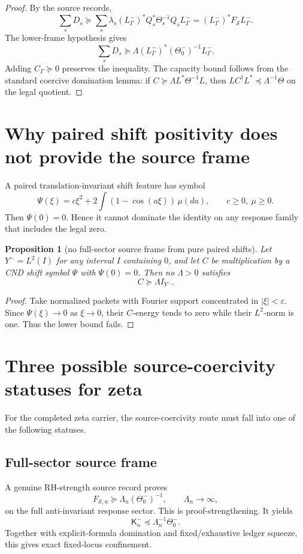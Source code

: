 \documentclass[11pt]{article}
\newtheorem{proposition}{Proposition}
\newcommand{\K}{\mathsf K}
\newcommand{\eps}{\varepsilon}
\begin{document}
\begin{proof}
By the source records,
\[
\sum_sD_s\succeq \sum_s\lambda_s(L^-_\Gamma)^*Q_s^*\Theta_s^{-1}Q_sL^-_\Gamma=(L^-_\Gamma)^*F_{\mathcal S}L^-_\Gamma.
\]
The lower-frame hypothesis gives
\[
\sum_sD_s\succeq \Lambda(L^-_\Gamma)^*(\Theta_0^-)^{-1}L^-_\Gamma.
\]
Adding \(C_\Gamma\succeq0\) preserves the inequality.  The capacity bound follows from the standard coercive domination lemma: if \(C\succeq \Lambda L^*\Theta^{-1}L\), then \(LC^\dagger L^*\preceq \Lambda^{-1}\Theta\) on the legal quotient.
\end{proof}

\section{Why paired shift positivity does not provide the source frame}
A paired translation-invariant shift feature has symbol
\[
\Psi(\xi)=c\xi^2+2\int(1-\cos(a\xi))\,\mu(da),\qquad c\ge0,\ \mu\ge0.
\]
Then \(\Psi(0)=0\).  Hence it cannot dominate the identity on any response family that includes the legal zero.

\begin{proposition}[no full-sector source frame from pure paired shifts]
Let \(Y^-=L^2(I)\) for any interval \(I\) containing \(0\), and let \(C\) be multiplication by a CND shift symbol \(\Psi\) with \(\Psi(0)=0\).  Then no \(\Lambda>0\) satisfies
\[
C\succeq \Lambda I_{Y^-}.
\]
\end{proposition}

\begin{proof}
Take normalized packets with Fourier support concentrated in \(|\xi|<\eps\). Since \(\Psi(\xi)\to0\) as \(\xi\to0\), their \(C\)-energy tends to zero while their \(L^2\)-norm is one. Thus the lower bound fails.
\end{proof}

\section{Three possible source-coercivity statuses for zeta}
For the completed zeta carrier, the source-coercivity route must fall into one of the following statuses.

\subsection{Full-sector source frame}
A genuine RH-strength source record proves
\[
F_{\mathcal S,n}\succeq \Lambda_n(\Theta_0^-)^{-1},\qquad \Lambda_n\to\infty,
\]
on the full anti-invariant response sector.  This is proof-strengthening.  It yields
\[
\K_n^-\preceq \Lambda_n^{-1}\Theta_0^-.
\]
Together with explicit-formula domination and fixed/exhaustive ledger squeeze, this gives exact fixed-locus confinement.
\end{document}

